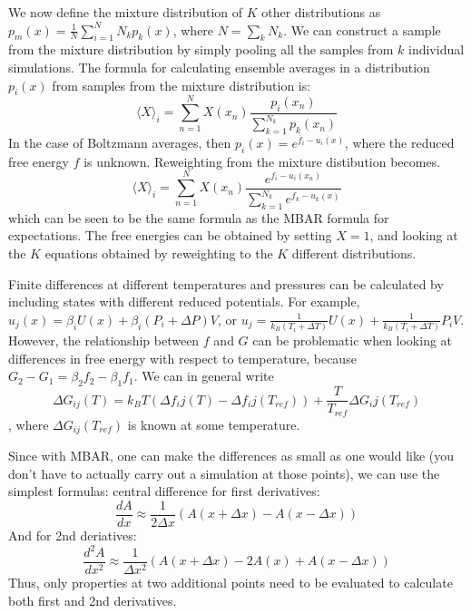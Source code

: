 \documentclass[9pt,bestpractices]{livecoms}
\begin{document}
We now define the mixture distribution of $K$ other distributions as
$p_m(x) = \frac{1}{N} \sum_{i=1}^N N_k p_k(x)$, where $N = \sum_k
N_k$.  We can construct a sample from the mixture distribution by
simply pooling all the samples from $k$ individual simulations.
The formula for calculating ensemble averages in a distribution $p_i(x)$
from samples from the mixture distribution is:
\begin{equation}
\langle X \rangle_i = \sum_{n=1}^N X(x_n) \frac{p_i(x_n)}{\sum_{k=1}^{N_k} p_k(x_n)}
\end{equation}
In the case of Boltzmann averages, then $p_i(x) = e^{f_i-u_i(x)}$, where
the reduced free energy $f$ is unknown.  Reweighting from the mixture
distibution becomes.
\begin{equation}
\langle X \rangle_i = \sum_{n=1}^N X(x_n) \frac{e^{f_i - u_i(x_n)}}{\sum_{k=1}^{N_k} e^{f_k - u_k(x)}}
\end{equation}
which can be seen to be the same formula as the MBAR formula for
expectations. The free energies can be obtained by setting $X = 1$, and
looking at the $K$ equations obtained by reweighting to the $K$
different distributions. 

Finite differences at different temperatures and pressures can be
calculated by including states with different reduced potentials. For
example, $u_j(x) = \beta_i U(x) + \beta_i (P_i + \Delta P) V$, or $u_j
= \frac{1}{k_B(T_i + \Delta T)} U(x) + \frac{1}{k_B(T_i + \Delta T)}
P_i V$. However, the relationship between $f$ and $G$ can be
problematic when looking at differences in free energy with respect to
temperature, because $G_2 - G_1 = \beta_2 f_2 - \beta_1 f_1$.  
We can in general write
\[\Delta G_{ij}(T) = k_B T \left (\Delta f_ij(T) - \Delta f_ij(T_{ref})\right) + \frac{T}{T_{ref}}\Delta G_ij(T_{ref})\], 
where $\Delta G_{ij}(T_{ref})$ is known at some temperature.

 

Since with MBAR, one can make the differences as small as one would
like (you don't have to actually carry out a simulation at those
points), we can use the simplest formulas: central difference for
first derivatives:
\[\frac{dA}{dx} \approx \frac{1}{2\Delta x}\left( A(x+\Delta x) - A(x-\Delta x)\right)\]
And for 2nd deriatives:
\[\frac{d^2A}{dx^2} \approx \frac{1}{\Delta x^2}\left( A(x+\Delta x) - 2A(x) + A(x-\Delta x)\right)\]
Thus, only properties at two additional points need to be evaluated to
calculate both first and 2nd derivatives.  
\end{document}
